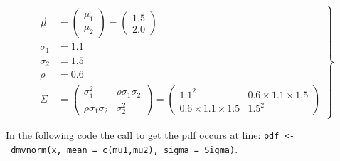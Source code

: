 \documentclass[
]{book}
\begin{document}
\begin{equation} 
\left.\begin{aligned}
\overrightarrow{
\mu}&=
\left( \begin{matrix}
\mu_1 \\
\mu_2
\end{matrix}
\right)
=\left( \begin{matrix}
1.5 \\
2.0
\end{matrix}
\right) \\
\sigma_1 &= 1.1 \\
\sigma_2 &= 1.5 \\
\rho &= 0.6 \\
\Sigma&=
\left( 
\begin{matrix}
\sigma_1^2 & \rho \sigma_1 \sigma_2 \\
\rho \sigma_1 \sigma_2  & \sigma_2^2
\end{matrix}\right)
=
\left( 
\begin{matrix}
1.1^2 & 0.6 \times 1.1 \times 1.5 \\
0.6 \times 1.1 \times 1.5  & 1.5^2
\end{matrix}\right)\end{aligned}\right\}
\label{eq:bivariate-binormal-model-parameters}
\end{equation}

In the following code the call to get the pdf occurs at line: \texttt{pdf\ \textless{}-\ dmvnorm(x,\ mean\ =\ c(mu1,mu2),\ sigma\ =\ Sigma)}.
\end{document}
